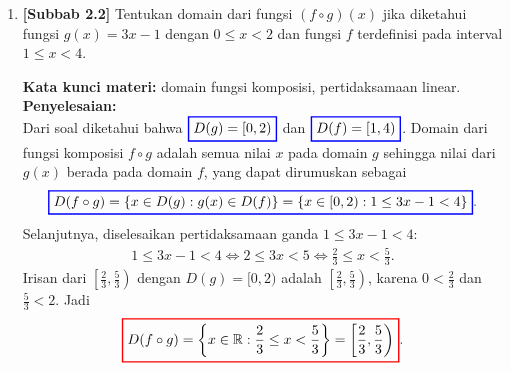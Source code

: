 \documentclass[10pt,openany,a4paper]{article}
\theoremstyle{definition}
\theoremstyle{definition}
\theoremstyle{plain}
\newenvironment{jawab}[2][tes]{%
\par\noindent\textbf{Kata kunci materi:} #1.\\
\textbf{Penyelesaian:} #2%
}{}
\begin{document}
\begin{enumerate}
    \item \textbf{[Subbab 2.2]} Tentukan domain dari fungsi $(f\circ g)(x)$ jika diketahui fungsi $g(x)=3x-1$ dengan $0\leq x<2$ dan fungsi $f$ terdefinisi pada interval $1\leq x<4$.
    \begin{jawab}[domain fungsi komposisi, pertidaksamaan linear]{~\\
        Dari soal diketahui bahwa $\colorlet{oldcolor}{.}
        \color{blue}
        \setlength{\fboxrule}{1pt} \boxed{\color{oldcolor}D(g)=[0,2)}\color{oldcolor}$ dan $\colorlet{oldcolor}{.}
        \color{blue}
        \setlength{\fboxrule}{1pt} \boxed{\color{oldcolor}D(f)=[1,4)}\color{oldcolor}$. Domain dari fungsi komposisi $f\circ g$ adalah semua nilai $x$ pada domain $g$ sehingga nilai dari $g(x)$ berada pada domain $f$, yang dapat dirumuskan sebagai
        \begin{align*}
            \colorlet{oldcolor}{.}
        \color{blue}
        \setlength{\fboxrule}{1pt} \boxed{\color{oldcolor}D(f\circ g) = \{x \in D(g) : g(x) \in D(f)\} = \{x \in [0,2) : 1\leq 3x-1<4\}}\color{oldcolor}.
        \end{align*}
        Selanjutnya, diselesaikan pertidaksamaan ganda $1\leq 3x-1<4$:
        \begin{align*}
            1\leq 3x-1<4 \iff 2\leq 3x<5 \iff \frac{2}{3}\leq x<\frac{5}{3}.
        \end{align*}
        Irisan dari $\left[\frac{2}{3},\frac{5}{3}\right)$ dengan $D(g)=[0,2)$ adalah $\left[\frac{2}{3},\frac{5}{3}\right)$, karena $0<\frac{2}{3}$ dan $\frac{5}{3}<2$. Jadi
        \begin{align*}
            \colorlet{oldcolor}{.}
        \color{red}
        \setlength{\fboxrule}{1pt} \boxed{\color{oldcolor}D(f\circ g) = \left\{x\in\mathbb{R} : \frac{2}{3}\leq x<\frac{5}{3}\right\} = \left[\frac{2}{3},\frac{5}{3}\right)}\color{oldcolor}.
        \end{align*}
    }
    \end{jawab}


\end{enumerate}
\end{document}
